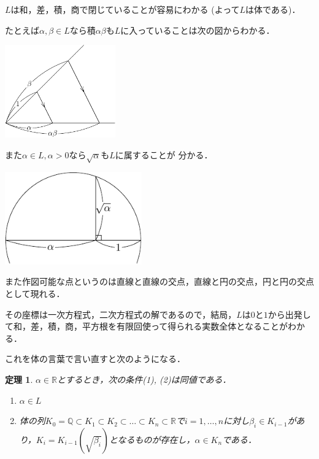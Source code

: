 \documentclass[dvipdfmx,17pt]{beamer}
\theoremstyle{plain}
\newtheorem{thm}{定理}
\newcommand{\Q}{\mathbb{Q}}
\newcommand{\R}{\mathbb{R}}
\begin{document}
\begin{frame}
$L$は和，差，積，商で閉じていることが容易にわかる (よって$L$は体である)．

たとえば$\alpha, \beta \in L$なら積$\alpha \beta$も$L$に入っていることは次の図からわかる．

\begin{center}\includegraphics[height=4cm]{mult-crop.pdf}\end{center}
\end{frame}

\begin{frame}
また$\alpha \in L, \alpha > 0$なら$\sqrt{\alpha}$も$L$に属することが
分かる．

\begin{center}\includegraphics[height=4cm]{sqrt-crop.pdf}\end{center}
\end{frame}

\begin{frame}
また作図可能な点というのは直線と直線の交点，直線と円の交点，円と円の交点として現れる．

その座標は一次方程式，二次方程式の解であるので，結局，$L$は$0$と$1$から出発して和，差，積，商，平方根を有限回使って得られる実数全体となることがわかる．
\end{frame}

\begin{frame}
これを体の言葉で言い直すと次のようになる．

\begin{thm}
$\alpha \in \R$とするとき，次の条件(1), (2)は同値である．
\begin{enumerate}
\item $\alpha \in L$
\item 体の列$K_0 = \Q \subset K_1 \subset K_2 \subset \dots \subset K_n \subset \R$で$i = 1, \dots, n$に対し$\beta_i \in K_{i-1}$があり，$K_i = K_{i-1}(\sqrt{\beta_i})$となるものが存在し，$\alpha \in K_n$である．
\end{enumerate}
\end{thm}
\end{frame}
\end{document}
